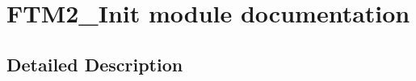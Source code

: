 \hypertarget{group___f_t_m2___init__module}{}\section{F\+T\+M2\+\_\+\+Init module documentation}
\label{group___f_t_m2___init__module}


\subsection{Detailed Description}
